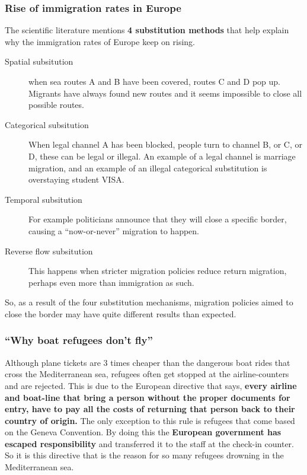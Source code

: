 \documentclass[../summary.tex]{subfiles}
\begin{document}
 	\subsubsection{Rise of immigration rates in Europe}
 	The scientific literature mentions \textbf{4 substitution methods} that help explain why the immigration rates of Europe keep on rising.
 	\begin{description}
 		\item[Spatial subsitution] when sea routes A and B have been covered, routes C and D pop up. Migrants have always found new routes and it seems impossible to close all possible routes.
 		\item[Categorical subsitution] When legal channel A has been blocked, people turn to channel B, or C, or D, these can be legal or illegal. An example of a legal channel is marriage migration, and an example of an illegal categorical substitution is overstaying student VISA.
 		\item[Temporal subsitution] For example politicians announce that they will close a specific border, causing a ``now-or-never'' migration to happen.
 		\item[Reverse flow subsitution] This happens when stricter migration policies reduce return migration, perhaps even more than immigration as such.
 	\end{description}
 	So, as a result of the four substitution mechanisms, migration policies aimed to close the border may have quite different results than expected.
 	
 	\subsubsection{``Why boat refugees don't fly''}
 	Although plane tickets are 3 times cheaper than the dangerous boat rides that cross the Mediterranean sea, refugees often get stopped at the airline-counters and are rejected. This is due to the European directive that says, \textbf{every airline and boat-line that bring a person without the proper documents for entry, have to pay all the costs of returning that person back to their country of origin.} The only exception to this rule is refugees that come based on the Geneva Convention. By doing this the \textbf{European government has escaped responsibility }and transferred it to the staff at the check-in counter. So it is this directive that is the reason for so many refugees drowning in the Mediterranean sea.
 	
\end{document}
